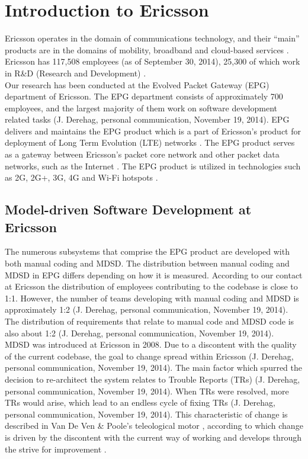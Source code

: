 \documentclass[final_report_innit.tex]{subfiles}
\begin{document}
\section{Introduction to Ericsson}
Ericsson operates in the domain of communications technology, and their ``main'' products are in the domains of mobility, broadband and cloud-based services \cite{etc} \cite{ecf}. Ericsson has 117,508 employees (as of September 30, 2014), 25,300 of which work in R\&D (Research and Development) \cite{etc}.
\\

Our research has been conducted at the Evolved Packet Gateway (EPG) department of Ericsson. The EPG department consists of approximately 700 employees, and the largest majority of them work on software development related tasks (J. Derehag, personal communication, November 19, 2014). EPG delivers and maintains the EPG product which is a part of Ericsson’s product for deployment of Long Term Evolution (LTE) networks \cite{eepg}. The EPG product serves as a gateway between Ericsson’s packet core network and other packet data networks, such as the Internet \cite{eepg}. The EPG product is utilized in technologies such as 2G, 2G+, 3G, 4G and Wi-Fi hotspots \cite{eepg}.

\subsection{Model-driven Software Development at Ericsson}
The numerous subsystems that comprise the EPG product are developed with both manual coding and MDSD. The distribution between manual coding and MDSD in EPG differs depending on how it is measured. According to our contact at Ericsson the distribution of employees contributing to the codebase is close to 1:1. However, the number of teams developing with manual coding and MDSD is approximately 1:2 (J. Derehag, personal communication, November 19, 2014). The distribution of requirements that relate to manual code and MDSD code is also about 1:2 (J. Derehag, personal communication, November 19, 2014).
\\

MDSD was introduced at Ericsson in 2008. Due to a discontent with the quality of the current codebase, the goal to change spread within Ericsson (J. Derehag, personal communication, November 19, 2014). The main factor which spurred the decision to re-architect the system relates to Trouble Reports (TRs) (J. Derehag, personal communication, November 19, 2014). When TRs were resolved, more TRs would arise, which lead to an endless cycle of fixing TRs (J. Derehag, personal communication, November 19, 2014). This characteristic of change is described in Van De Ven \& Poole’s teleological motor \cite{van1995explaining}, according to which change is driven by the discontent with the current way of working and develops through the strive for improvement \cite{van1995explaining}. 
\\
\end{document}
